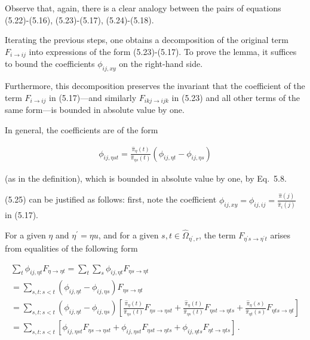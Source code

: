 \documentclass[10pt,a4paper]{article}
\begin{document}
Observe that, again, there is a clear analogy between the pairs of equations (5.22)-(5.16), (5.23)-(5.17), (5.24)-(5.18).\par




Iterating the previous steps, one obtains a decomposition of the original term $F_{i\rightarrow ij}$ into expressions of the form (5.23)-(5.17). To prove the lemma, it suffices to bound the coefficients $\phi_{ij,xy}$ on the right-hand side.\par




Furthermore, this decomposition preserves the invariant that the coefficient of the term $F_{i\rightarrow ij}$ in (5.17)—and similarly $F_{ikj\rightarrow ijk}$ in (5.23) and all other terms of the same form—is bounded in absolute value by one.\par




In general, the coefficients are of the form\par


\[\begin{gathered}
\phi_{ij,\eta st}=\frac{\hat{\pi}_{\eta}(t)}{\hat{\pi}_{\eta s}(t)}(\phi_{ij,\eta t}-\phi_{ij,\eta s})
\end{gathered}\]


(as in the definition)\thinspace{},
which is bounded in absolute value by one, by Eq. 5.8.\par




(5.25) can be justified as follows: first, note the coefficient $\phi_{ij,xy}=\phi_{ij,ij}=\frac{\hat{\pi}(j)}{\hat{\pi}_{i}(j)}$ in (5.17).\par




For a given $\eta$ and $\eta^{\prime}=\eta u$, and for a given $s,t\in\hat{\Omega}_{\eta^{\prime},r}$, the term $F_{\eta^{\prime}s\rightarrow\eta^{\prime}t}$ arises from equalities of the following form\par




\[\begin{gathered}
\displaystyle\sum_{t}\phi_{ij,\eta t}F_{\eta\rightarrow\eta t} \displaystyle=\sum_{t}\sum_{s}\phi_{ij,\eta t}F_{\eta s\rightarrow\eta t} \\
\displaystyle=\sum_{s,t:s<t}(\phi_{ij,\eta t}-\phi_{ij,\eta s})F_{\eta s\rightarrow\eta t} \\
\displaystyle=\sum_{s,t:s<t}(\phi_{ij,\eta t}-\phi_{ij,\eta s})\left[\frac{\hat{\pi}_{\eta}(t)}{\hat{\pi}_{\eta s}(t)}F_{\eta s\rightarrow\eta st}+\frac{\hat{\pi}_{\eta}(t)}{\hat{\pi}_{\eta s}(t)}F_{\eta st\rightarrow\eta ts}+\frac{\hat{\pi}_{\eta}(s)}{\hat{\pi}_{\eta t}(s)}F_{\eta ts\rightarrow\eta t}\right] \\
\displaystyle=\sum_{s,t:s<t}\left[\phi_{ij,\eta st}F_{\eta s\rightarrow\eta st}+\phi_{ij,\eta st}F_{\eta st\rightarrow\eta ts}+\phi_{ij,\eta ts}F_{\eta t\rightarrow\eta ts}\right]\,.
\end{gathered}\]
\end{document}
